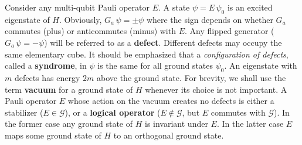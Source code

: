 Consider any multi-qubit Pauli operator $E$.
A state $\psi = E\,  \psi_0 $
is an excited eigenstate of $H$. Obviously, $G_a \, \psi=\pm \psi$
where the sign depends on whether $G_a$ commutes (plus)
or anticommutes (minus) with $E$.
Any flipped generator ($G_a\, \psi=-\psi$) will be referred to as a {\bf defect}.
Different defects may occupy the same elementary cube.
It should be emphasized that 
a {\em configuration of  defects}, called a {\bf syndrome}, in $\psi$ is the same for all ground states $\psi_0$.
An eigenstate with $m$ defects has energy $2m$ above the ground state.
For brevity, we shall use the term {\bf vacuum} for a  ground state of $H$
whenever its choice  is not important.
A Pauli operator $E$ whose action on the vacuum creates no defects is either a stabilizer ($E\in \mathcal G$),
or a {\bf logical operator} ($E\notin \mathcal G$, but $E$ commutes with $\mathcal G$).
In the former case any ground state of $H$ is invariant under $E$.
In the latter case $E$ maps some ground state of $H$ to an orthogonal ground state.

